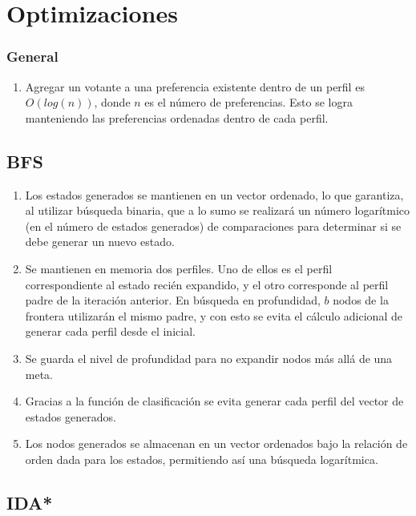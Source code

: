 \documentclass[letterpaper,12pt, titlepage]{article}
\begin{document}
\section{Optimizaciones}

\subsubsection*{General}
    \begin{enumerate}
       \item Agregar un votante a una preferencia existente dentro de un perfil
       es $O(log(n))$, donde $n$ es el número de preferencias. Esto se logra
       manteniendo las preferencias ordenadas dentro de cada perfil.
    \end{enumerate}

\subsection*{BFS}
    \begin{enumerate}
       \item Los estados generados se mantienen en un vector ordenado,
       lo que garantiza, al utilizar búsqueda binaria, que a lo sumo
       se realizará un número logarítmico (en el número de estados
       generados) de comparaciones para determinar si se debe generar un
       nuevo estado.

		\item Se mantienen en memoria dos perfiles. Uno de ellos es el perfil
		correspondiente al estado recién expandido,
        y el otro corresponde al perfil padre de la iteración anterior. En
        búsqueda en profundidad, $b$ nodos
		de la frontera utilizarán el mismo padre, y con esto se evita
		el cálculo adicional de generar cada perfil desde el inicial.
		
		\item Se guarda el nivel de profundidad para no expandir nodos más
		allá de una meta.
		
		\item Gracias a la función de clasificación se evita generar
		cada perfil del vector de estados generados. 

		\item Los nodos generados se almacenan en un vector ordenados
		bajo la relación de orden dada para los estados, permitiendo
		así una búsqueda logarítmica.
\end{enumerate}

\subsection*{IDA*}
\end{document}
